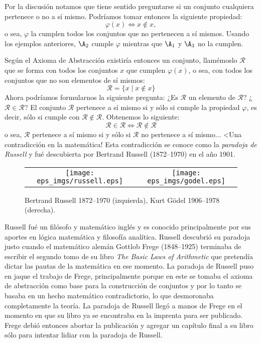 Por la discusión notamos que tiene sentido preguntarse si un conjunto cualquiera pertenece o no a sí mismo.
Podríamos tomar entonces la siguiente propiedad:
\[
\varphi(x)\Leftrightarrow x\notin x,
\]
o sea, $\varphi$ la cumplen todos los conjuntos que no pertenecen a sí mismos.
Usando los ejemplos anteriores, $\A_2$ cumple $\varphi$ mientras que $\A_1$ y $\A_3$ no la cumplen. 

Según el Axioma de Abstracción existiría entonces un conjunto, llamémoslo $\mathcal{R}$ que se forma con todos los conjuntos $x$ que cumplen $\varphi(x)$, o sea, con todos los conjuntos que no son elementos de sí mismos:
\[
\mathcal{R}=\{x\;|\;x\notin x\}
\]
Ahora podríamos formularnos la siguiente pregunta:
¿Es $\mathcal{R}$ un elemento de $\mathcal{R}$? ¿$\mathcal{R}\in\mathcal{R}$?
El conjunto $\mathcal{R}$ pertenece a sí mismo si y sólo si cumple la propiedad $\varphi$, es decir, sólo si cumple con $\mathcal{R}\notin\mathcal{R}$.
Obtenemos lo siguiente:
\[
\mathcal{R}\in\mathcal{R}\Leftrightarrow\mathcal{R}\notin\mathcal{R}
\]
o sea, $\mathcal{R}$ pertenece a sí mismo si y sólo si $\mathcal{R}$ no pertenece a sí mismo... <Una contradicción en la matemática!
Esta contradicción se conoce como la \emph{paradoja de Russell} y fué descubierta por Bertrand Russell (1872--1970) en el año 1901.

\begin{nota}

\begin{figure}[h!]
	\begin{center}
	\begin{tabular}{cc}
	\texttt{[image: eps\_imgs/russell.eps]} \hspace*{30pt} &
	\hspace*{30pt} \texttt{[image: eps\_imgs/godel.eps]}
	\end{tabular}
	\end{center}
	\caption[]{Bertrand Russell 1872--1970 (izquierda), Kurt G\"odel 1906--1978 (derecha).}
\end{figure}

Russell fué un filósofo y matemático inglés y es conocido principalmente por sus aportes en lógica matemática y filosofía analítica.
Russell descubrió su paradoja justo cuando el matemático alemán Gottlob Frege (1848--1925) terminaba de escribir el segundo tomo de su libro \emph{The Basic Laws of Arithmetic} que pretendía dictar las pautas de la matemática en ese momento.
La paradoja de Russell puso en jaque el trabajo de Frege, principalmente porque en este se tomaba el axioma de abstracción como base para la construcción de conjuntos y por lo tanto se basaba en un hecho matemático contradictorio, lo que desmoronaba completamente la teoría.
La paradoja de Russell llegó a manos de Frege en el momento en que su libro ya se encontraba en la imprenta para ser publicado.
Frege debió entonces abortar la publicación y agregar un capítulo final a su libro sólo para intentar lidiar con la paradoja de Russell.
\end{nota}


